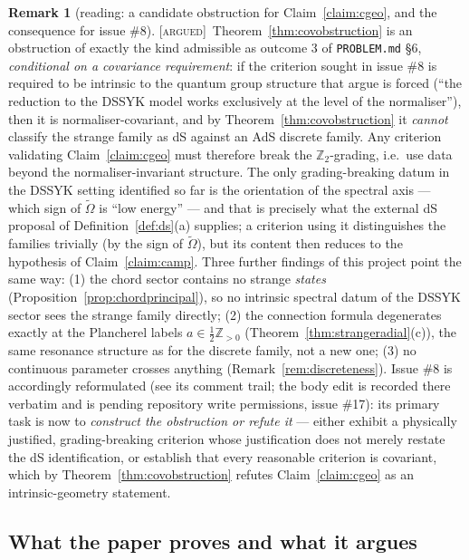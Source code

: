 \documentclass[11pt,a4paper]{article}
\newcommand{\ARGUED}{{\color{orange}\textsc{[argued]}}}
\theoremstyle{definition}
\newtheorem{remark}[definition]{Remark}
\theoremstyle{plain}
\newcommand{\tCas}{\tilde\Omega}                %
\newcommand{\Z}{\mathbb{Z}}
\begin{document}
\begin{remark}[reading: a candidate obstruction for Claim~\ref{claim:cgeo}, and the
consequence for issue \#8]\label{rem:obstructionreading}
\ARGUED\ Theorem~\ref{thm:covobstruction} is an obstruction of exactly the kind admissible
as outcome 3 of \texttt{PROBLEM.md} \S6, \emph{conditional on a covariance requirement}: if
the criterion sought in issue \#8 is required to be intrinsic to the quantum group structure
that \cite{Schouten:2025dssyk} argue is forced (``the reduction to the DSSYK model works
exclusively at the level of the normaliser''), then it is normaliser-covariant, and by
Theorem~\ref{thm:covobstruction} it \emph{cannot} classify the strange family as dS against
an AdS discrete family. Any criterion validating Claim~\ref{claim:cgeo} must therefore
break the $\Z_2$-grading, i.e.\ use data beyond the normaliser-invariant structure. The only
grading-breaking datum in the DSSYK setting identified so far is the orientation of the
spectral axis --- which sign of $\tCas$ is ``low energy'' --- and that is precisely what the
external dS proposal of Definition~\ref{def:ds}(a) supplies; a criterion using it
distinguishes the families trivially (by the sign of $\tCas$), but its content then reduces
to the hypothesis of Claim~\ref{claim:camp}. Three further findings of this project point
the same way: (1) the chord sector contains no strange \emph{states}
(Proposition~\ref{prop:chordprincipal}), so no intrinsic spectral datum of the DSSYK sector
sees the strange family directly; (2) the connection formula degenerates exactly at the
Plancherel labels $a\in\tfrac12\Z_{>0}$ (Theorem~\ref{thm:strangeradial}(c)), the same
resonance structure as for the discrete family, not a new one; (3) no continuous parameter
crosses anything (Remark~\ref{rem:discreteness}). Issue \#8 is accordingly reformulated (see
its comment trail; the body edit is recorded there verbatim and is pending repository write
permissions, issue \#17): its primary task is now to \emph{construct the
obstruction or refute it} --- either exhibit a physically justified, grading-breaking
criterion whose justification does not merely restate the dS identification, or establish
that every reasonable criterion is covariant, which by Theorem~\ref{thm:covobstruction}
refutes Claim~\ref{claim:cgeo} as an intrinsic-geometry statement.
\end{remark}

\subsection{What the paper proves and what it argues}
\label{sec:provedvsargued}
\end{document}
